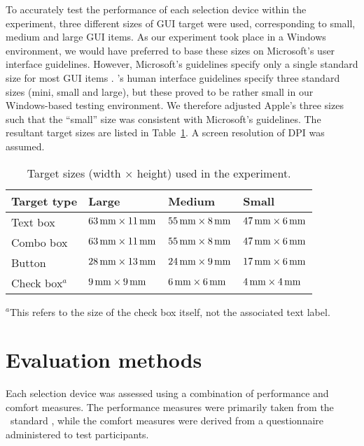\documentclass[a4paper]{article}
\begin{document}
To accurately test the performance of each selection device within the
experiment, three different sizes of GUI target were used, corresponding
to small, medium and large GUI items. As our experiment took place in a
Windows environment, we would have preferred to base these sizes on
Microsoft's user interface guidelines. However, Microsoft's guidelines
specify only a single standard size for most GUI items \citep[pp.\
448--450]{MS-1999-UI}. \citeauthor{Appl-2004-HIG}'s
\citeyearpar{Appl-2004-HIG} human interface guidelines specify three
standard sizes (mini, small and large), but these proved to be rather
small in our Windows-based testing environment. We therefore adjusted
Apple's three sizes such that the ``small'' size was consistent with
Microsoft's guidelines. The resultant target sizes are listed in
Table~\ref{tab-target-sizes}. A screen resolution of \unit[81]{DPI} was
assumed.


\begin{table}[ht]
	\caption{Target sizes (width \(\times\) height) used in the experiment.}
	\label{tab-target-sizes}
	\begin{tabular}{llll}
		\hline
		\textbf{Target type}	&	\textbf{Large}							&	\textbf{Medium}							&	\textbf{Small}	\\
		\hline
		Text box				&	\(\unit[63]{mm} \times \unit[11]{mm}\)	&	\(\unit[55]{mm} \times \unit[8]{mm}\)	&	\(\unit[47]{mm} \times \unit[6]{mm}\)	\\
		Combo box				&	\(\unit[63]{mm} \times \unit[11]{mm}\)	&	\(\unit[55]{mm} \times \unit[8]{mm}\)	&	\(\unit[47]{mm} \times \unit[6]{mm}\)	\\
		Button					&	\(\unit[28]{mm} \times \unit[13]{mm}\)	&	\(\unit[24]{mm} \times \unit[9]{mm}\)	&	\(\unit[17]{mm} \times \unit[6]{mm}\)	\\
		Check box\(^{a}\)		&	\(\unit[9]{mm} \times \unit[9]{mm}\)	&	\(\unit[6]{mm} \times \unit[6]{mm}\)	&	\(\unit[4]{mm} \times \unit[4]{mm}\)	\\
		\hline
	\end{tabular}
	
	{\footnotesize \(^{a}\)This refers to the size of the check box itself, not the associated text label.}
\end{table}


\section{Evaluation methods}
\label{sec-evaluation}

Each selection device was assessed using a combination of performance
and comfort measures. The performance measures were primarily taken from
the \ISOnine\ standard \citep{ISO-2000-9241-9}, while the comfort
measures were derived from a questionnaire administered to test
participants.
\end{document}

